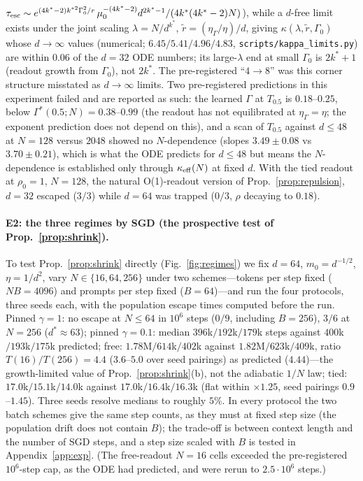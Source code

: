 $\tau_{\rm esc}\sim e^{(4k^*-2)k^{*2}\Gamma_0^2/r}\,\mu_0^{-(4k^*-2)}d^{2k^*-1}/(4k^*(4k^*-2)N)$), while a $d$-free limit exists under the joint
scaling $\lambda=N/d^{k^*}$, $\tilde r=(\eta_\Gamma/\eta)/d$, giving $\kappa(\lambda,\tilde r,\Gamma_0)$ whose $d\to\infty$ values (numerical; $6.45/5.41/4.96/4.83$, \texttt{scripts/kappa\_limits.py})
are within $0.06$ of the $d=32$ ODE numbers; its large-$\lambda$ end at small $\Gamma_0$ is $2k^*+1$ (readout growth from $\Gamma_0$), not $2k^*$.
The pre-registered ``$4\to8$'' was this corner structure misstated as $d\to\infty$ limits. Two pre-registered predictions in this experiment failed and are
reported as such: the learned $\Gamma$ at $T_{0.5}$ is $0.18$--$0.25$, below $\Gamma^*(0.5;N)=0.38$--$0.99$ (the readout has not equilibrated at
$\eta_\Gamma=\eta$; the exponent prediction does not depend on this), and a scan of $T_{0.5}$ against $d\le48$ at $N=128$ versus $2048$ showed
no $N$-dependence (slopes $3.49\pm0.08$ vs $3.70\pm0.21$), which is what the ODE predicts for $d\le48$ but means the $N$-dependence is
established only through $\kappa_{\rm eff}(N)$ at fixed $d$. With the tied readout at $\rho_0=1$, $N=128$, the natural O(1)-readout
version of Prop.~\ref{prop:repulsion}, $d=32$ escaped ($3/3$) while $d=64$ was trapped ($0/3$, $\rho$ decaying to $0.18$).

\paragraph{E2: the three regimes by SGD (the prospective test of Prop.~\ref{prop:shrink}).}
To test Prop.~\ref{prop:shrink} directly (Fig.~\ref{fig:regimes}) we fix $d=64$, $m_0=d^{-1/2}$, $\eta=1/d^2$, vary $N\in\{16,64,256\}$ under two schemes---tokens per
step fixed ($NB=4096$) and prompts per step fixed ($B=64$)---and run the four protocols, three seeds each, with the population
escape times computed before the run. Pinned $\gamma=1$: no escape at $N\le64$ in $10^6$ steps ($0/9$, including $B=256$), $3/6$ at $N=256$
($d^*\approx63$); pinned $\gamma=0.1$: median $396$k$/192$k$/179$k steps against $400$k$/193$k$/175$k predicted; free: $1.78$M$/614$k$/402$k
against $1.82$M$/623$k$/409$k, ratio $T(16)/T(256)=4.4$ ($3.6$--$5.0$ over seed pairings) as predicted ($4.44$)---the growth-limited value of
Prop.~\ref{prop:shrink}(b), not the adiabatic $1/N$ law; tied: $17.0$k$/15.1$k$/14.0$k against $17.0$k$/16.4$k$/16.3$k (flat within $\times1.25$,
seed pairings $0.9$--$1.45$). Three seeds resolve medians to roughly $5\%$. In every protocol the two batch schemes give the same step counts,
as they must at fixed step size (the population drift does not contain $B$); the trade-off is between context length and the number of
SGD steps, and a step size scaled with $B$ is tested in Appendix~\ref{app:exp}. (The free-readout $N=16$ cells exceeded the pre-registered
$10^6$-step cap, as the ODE had predicted, and were rerun to $2.5\cdot10^6$ steps.)



